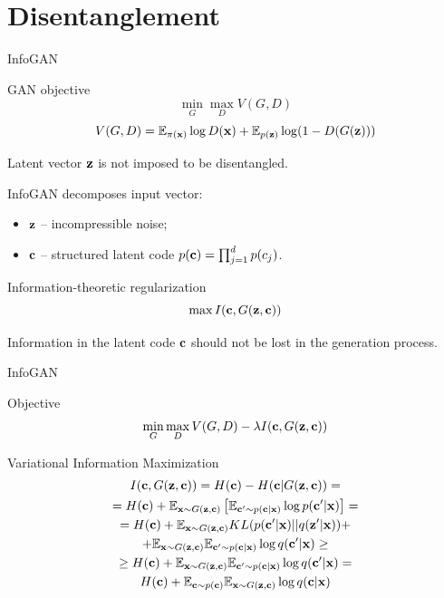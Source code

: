 \section{Disentanglement}
\begin{frame}{InfoGAN}
	\begin{block}{GAN objective}
		\vspace{-0.6cm}
		\[
		\min_{G} \max_D V(G, D)
		\]
		\[
		V(G, D)  =  \mathbb{E}_{\pi(\mathbf{x})} \log D(\mathbf{x}) + \mathbb{E}_{p(\mathbf{z})} \log (1 - D(G(\mathbf{z})))
		\]
	\end{block}
	Latent vector $\mathbf{z}$ is not imposed to be disentangled.
	
	InfoGAN decomposes input vector:
	\begin{itemize}
		\item $\mathbf{z}$ -- incompressible noise;
		\item $\mathbf{c}$ -- structured latent code $p(\mathbf{c}) = \prod_{j=1}^d p(c_j)$.
	\end{itemize}
	\begin{block}{Information-theoretic regularization}
		\vspace{-0.3cm}
		\[
		\max I (\mathbf{c}, G(\mathbf{z}, \mathbf{c}))
		\]
	\end{block}
	Information in the latent code $\mathbf{c}$ should not be lost in the generation process.
\end{frame}
\begin{frame}{InfoGAN}
	\begin{block}{Objective}
		\vspace{-0.3cm}
		\[
		\min_{G} \max_D V(G, D) - \lambda I (\mathbf{c}, G(\mathbf{z}, \mathbf{c}))
		\]
	\end{block}
	\begin{block}{Variational Information Maximization}
		\vspace{-0.3cm}
		\begin{multline*}
			I (\mathbf{c}, G(\mathbf{z}, \mathbf{c})) = H(\mathbf{c}) - H(\mathbf{c} | G(\mathbf{z}, \mathbf{c})) = \\
			= H(\mathbf{c}) + \mathbb{E}_{\mathbf{x} \sim G(\mathbf{z}, \mathbf{c})} \left[ \mathbb{E}_{\mathbf{c}' \sim p(\mathbf{c} | \mathbf{x})} \log p(\mathbf{c}' | \mathbf{x}) \right] = \\ 
			= H(\mathbf{c}) + \mathbb{E}_{\mathbf{x} \sim G(\mathbf{z}, \mathbf{c})} KL(p(\mathbf{c}'| \mathbf{x}) || q(\mathbf{z}' | \mathbf{x})) + 
			\\ + \mathbb{E}_{\mathbf{x} \sim G(\mathbf{z}, \mathbf{c})}  \mathbb{E}_{\mathbf{c}' \sim p(\mathbf{c} | \mathbf{x})} \log q(\mathbf{c}' | \mathbf{x})  \geq\\
			\geq H(\mathbf{c}) + \mathbb{E}_{\mathbf{x} \sim G(\mathbf{z}, \mathbf{c})} \mathbb{E}_{\mathbf{c}' \sim p(\mathbf{c} | \mathbf{x})} \log q(\mathbf{c}' | \mathbf{x}) = \\
			H(\mathbf{c}) + \mathbb{E}_{\mathbf{c} \sim p(\mathbf{c})} \mathbb{E}_{\mathbf{x} \sim G(\mathbf{z}, \mathbf{c})} \log q(\mathbf{c} | \mathbf{x})
		\end{multline*}
	\end{block}
\end{frame}
